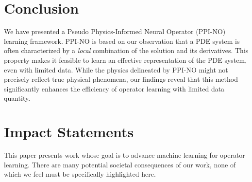 \section{Conclusion}
We have presented a  Pseudo Physics-Informed Neural Operator (PPI-NO) learning framework. PPI-NO is based on our observation that a PDE system is often characterized by a \textit{local} combination of the solution and its derivatives. This property makes it feasible to learn an effective representation of the PDE system, even with limited data.
While the physics delineated by PPI-NO might not precisely reflect true physical phenomena, our findings reveal that this method significantly enhances the efficiency of operator learning with limited data quantity. %



\section{Impact Statements}
This paper presents work whose goal is to advance machine learning for operator learning. There are many potential societal consequences of our work, none of which we feel must be specifically highlighted here.